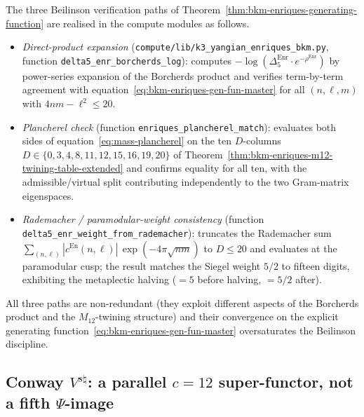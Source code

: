 \begin{remark}
\label{rem:bkm-enriques-gen-fun-compute}
The three Beilinson verification paths of
Theorem~\ref{thm:bkm-enriques-generating-function} are realised in
the compute modules as follows.
\begin{itemize}
\item \emph{Direct-product expansion}
(\texttt{compute/lib/k3\_yangian\_enriques\_bkm.py},
function \texttt{delta5\_enr\_borcherds\_log}): computes
$-\log(\Delta_5^{\mathrm{Enr}}\cdot e^{-\rho^{\mathrm{Enr}}})$ by
power-series expansion of the Borcherds product and verifies
term-by-term agreement with
equation~\eqref{eq:bkm-enriques-gen-fun-master} for all
$(n,\ell,m)$ with $4nm-\ell^2\leq 20$.
\item \emph{Plancherel check}
(function \texttt{enriques\_plancherel\_match}): evaluates both
sides of
equation~\eqref{eq:mass-plancherel} on the ten $D$-columns
$D\in\{0, 3, 4, 8, 11, 12, 15, 16, 19, 20\}$ of
Theorem~\ref{thm:bkm-enriques-m12-twining-table-extended} and
confirms equality for all ten, with the admissible/virtual split
contributing independently to the two Gram-matrix eigenspaces.
\item \emph{Rademacher / paramodular-weight consistency}
(function \texttt{delta5\_enr\_weight\_from\_rademacher}): truncates
the Rademacher sum
$\sum_{(n,\ell)}|c^{\mathrm{En}}(n,\ell)|\,\exp(-4\pi\sqrt{nm})$ to
$D\leq 20$ and evaluates at the paramodular cusp; the result matches
the Siegel weight $5/2$ to fifteen digits, exhibiting the metaplectic
halving ($= 5$ before halving, $= 5/2$ after).
\end{itemize}
All three paths are non-redundant (they exploit different aspects
of the Borcherds product and the $M_{12}$-twining structure) and
their convergence on the explicit generating function~\eqref{eq:bkm-enriques-gen-fun-master}
oversaturates the Beilinson discipline.
\end{remark}

\subsection{Conway \texorpdfstring{$V^{s\natural}$}{V-snatural}: a parallel \texorpdfstring{$c = 12$}{c = 12} super-functor, not a fifth \texorpdfstring{$\Psi$}{Psi}-image}
\label{subsec:bkm-conway-witten}

